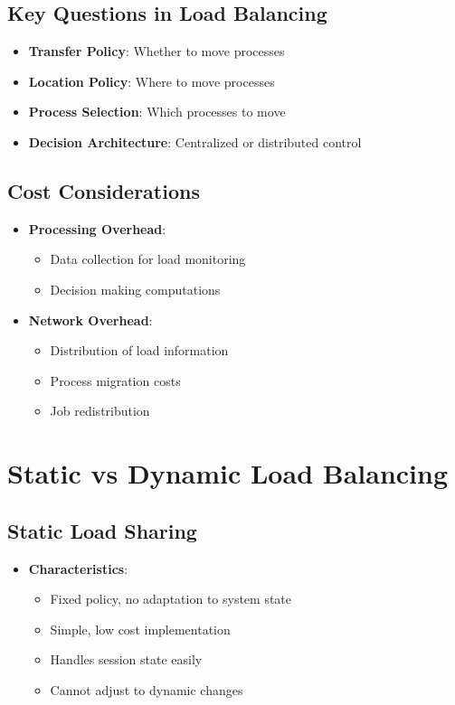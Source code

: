 \documentclass[12pt]{article}
\begin{document}
\subsection{Key Questions in Load Balancing}
\begin{itemize}
\item \textbf{Transfer Policy}: Whether to move processes
\item \textbf{Location Policy}: Where to move processes
\item \textbf{Process Selection}: Which processes to move
\item \textbf{Decision Architecture}: Centralized or distributed control
\end{itemize}

\subsection{Cost Considerations}
\begin{itemize}
\item \textbf{Processing Overhead}:
  \begin{itemize}
  \item Data collection for load monitoring
  \item Decision making computations
  \end{itemize}
  
\item \textbf{Network Overhead}:
  \begin{itemize}
  \item Distribution of load information
  \item Process migration costs
  \item Job redistribution
  \end{itemize}
\end{itemize}

\section{Static vs Dynamic Load Balancing}

\subsection{Static Load Sharing}
\begin{itemize}
\item \textbf{Characteristics}:
  \begin{itemize}
  \item Fixed policy, no adaptation to system state
  \item Simple, low cost implementation
  \item Handles session state easily
  \item Cannot adjust to dynamic changes
  \end{itemize}
\end{itemize}
\end{document}
